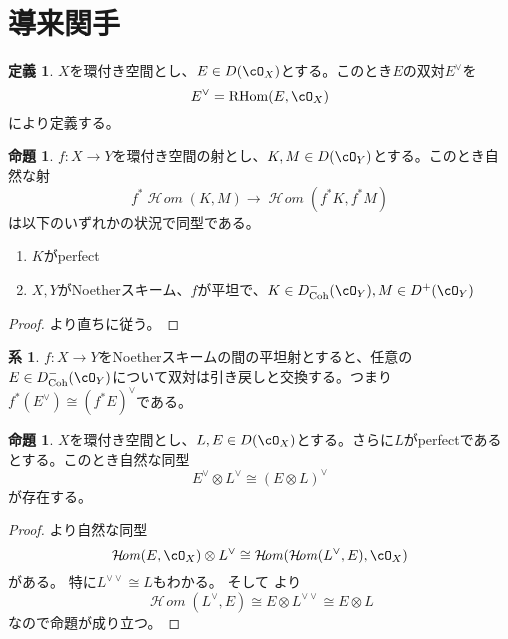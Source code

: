 \documentclass[uplatex, a4paper, dvipdfmx]{jsarticle}
\theoremstyle{definition}
\newtheorem{definition}[theorem]{定義}
\newtheorem{proposition}[theorem]{命題}
\newtheorem{corollary}[theorem]{系}
\DeclareMathOperator{\CHom}{\mathcal{H}\!\mathit{om}}
\DeclareMathOperator{\RHom}{\mathrm{RHom}}
\DeclareMathOperator{\Coh}{\mathrm{Coh}}
\begin{document}
\section{導来関手}
\begin{definition}
    $X$を環付き空間とし、$E \in D(\cO_X)$とする。このとき$E$の双対$E^\vee$を
    \begin{equation}
        E^\vee = \RHom(E, \cO_X)
    \end{equation}
    により定義する。
\end{definition}
\begin{proposition}
    $f \colon X \to Y$を環付き空間の射とし、$K, M \in D(\cO_Y)$とする。このとき自然な射
    \begin{equation}
        f^*\CHom(K, M) \to \CHom(f^*K, f^*M)
    \end{equation}
    は以下のいずれかの状況で同型である。
    \begin{enumerate}
        \item $K$がperfect
        \item $X, Y$がNoetherスキーム、$f$が平坦で、$K \in D_{\Coh}^-(\cO_Y), M \in D^+(\cO_Y)$
    \end{enumerate}
\end{proposition}
\begin{proof}
    {\cite[\href{https://stacks.math.columbia.edu/tag/0GM7}{Tag 0GM7}]{stacks-project}}より直ちに従う。
\end{proof}
\begin{corollary}\label{cor:pullback-and-dual}
    $f \colon X \to Y$をNoetherスキームの間の平坦射とすると、任意の$E \in D_{\Coh}^-(\cO_Y)$について双対は引き戻しと交換する。つまり$f^*(E^\vee) \cong (f^*E)^\vee$である。
\end{corollary}
\begin{proposition}\label{prop:tensor-and-dual}
    $X$を環付き空間とし、$L, E \in D(\cO_X)$とする。さらに$L$がperfectであるとする。このとき自然な同型
    \begin{equation}
        E^\vee \otimes L^\vee \cong (E \otimes L)^\vee
    \end{equation}
    が存在する。
\end{proposition}
\begin{proof}
    {\cite[\href{https://stacks.math.columbia.edu/tag/0G40}{Tag 0G40}]{stacks-project}}より自然な同型
    \begin{equation}
        \CHom(E, \cO_X) \otimes L^\vee \cong \CHom(\CHom(L^\vee, E), \cO_X)
    \end{equation}
    がある。
    特に$L^{\vee\vee} \cong L$もわかる。
    そして {\cite[\href{https://stacks.math.columbia.edu/tag/08DQ}{Tag 08DQ}]{stacks-project}}より
    \begin{equation}
        \CHom(L^\vee, E) \cong E \otimes L^{\vee\vee} \cong E \otimes L
    \end{equation}
    なので命題が成り立つ。
\end{proof}
\end{document}
